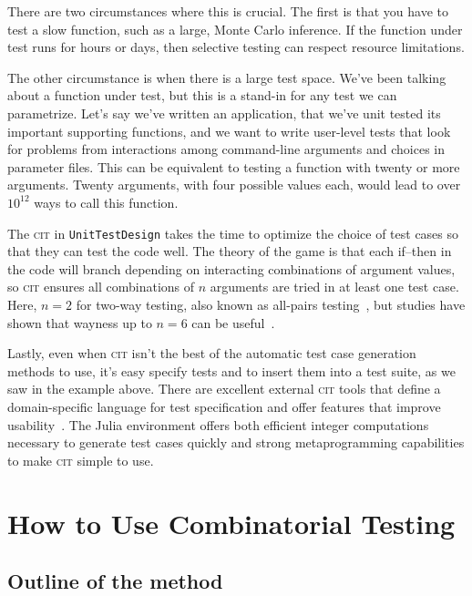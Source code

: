 \documentclass{juliacon}
\newcommand{\utd}{\texttt{UnitTestDesign}\xspace}
\newcommand{\cit}{\textsc{cit}\xspace}
\begin{document}
\vskip 6pt
There are two circumstances where this is crucial. The first is that you have to test a slow function, such as a large, Monte Carlo inference. If the function under test runs for hours or days, then selective testing can respect resource limitations.

\vskip 6pt
The other circumstance is when there is a large test space. We've been talking about a function under test, but this is a stand-in for any test we can parametrize. Let's say we've written an application, that we've unit tested its important supporting functions, and we want to write user-level tests that look for problems from interactions among command-line arguments and choices in parameter files. This can be equivalent to testing a function with twenty or more arguments. Twenty arguments, with four possible values each, would lead to over $10^{12}$ ways to call this function.

\vskip 6pt
The \cit in \utd takes the time to optimize the choice of test cases so that they can test the code well. The theory of the game is that each if--then in the code will branch depending on interacting combinations of argument values, so \cit ensures all combinations of $n$ arguments are tried in at least one test case. Here, $n=2$ for two-way testing, also known as all-pairs testing~\cite{pairwise-website}, but studies have shown that wayness up to $n=6$ can be useful~\cite{Petke2015-ex}.

\vskip 6pt
Lastly, even when \cit isn't the best of the automatic test case generation methods to use, it's easy specify tests and to insert them into a test suite, as we saw in the example above. There are excellent external \cit tools that define a domain-specific language for test specification and offer features that improve usability~\cite{Czerwonka2006-hm,Kuhn2010-ak}. The Julia environment offers both efficient integer computations necessary to generate test cases quickly and strong metaprogramming capabilities to make \cit simple to use.

\section{How to Use Combinatorial Testing}\label{sec:how-to-use}

\subsection{Outline of the method}
\end{document}

